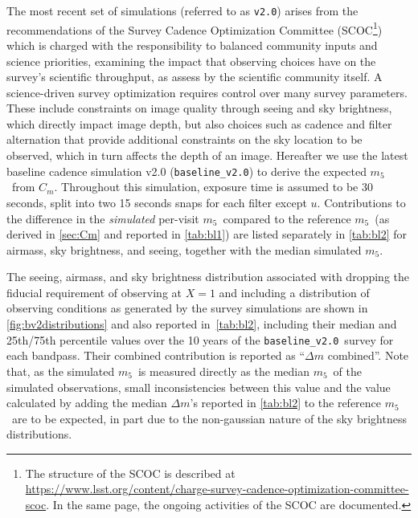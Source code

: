 \documentclass[PST,authoryear,toc]{lsstdoc}
\newcommand{\cm}{\ensuremath{C_m}}
\newcommand{\mf}{\ensuremath{m_5}}
\newcommand{\baseline}{\texttt{baseline\_v2.0}}
\begin{document}
 The most recent set of simulations (referred to as \texttt{v2.0}) arises from the recommendations of the Survey Cadence Optimization Committee (SCOC\footnote{The structure of the SCOC is described at \href{https://www.lsst.org/content/charge-survey-cadence-optimization-committee-scoc}{https://www.lsst.org/content/charge-survey-cadence-optimization-committee-scoc}. In the same page, the ongoing activities of the SCOC are documented.}) {which is charged with the responsibility to balanced community inputs and science priorities, examining the impact that observing choices have on the survey's scientific throughput, as assess by the scientific community itself. A science-driven survey optimization requires control over many survey parameters. These include constraints on image quality through seeing and sky brightness, which directly impact image depth, but also choices such as cadence and filter alternation that provide additional constraints on the sky location to be observed, which in turn affects the depth of an image}. Hereafter we use the latest baseline cadence simulation v2.0
(\baseline) to derive the expected \mf\ from \cm. Throughout this simulation, %
exposure time is assumed to be 30 seconds, split into two 15 seconds snaps for each filter except $u$. Contributions to the difference in the {\it simulated} per-visit \mf\ compared to the reference \mf\ (as derived in \autoref{sec:Cm} and reported in \autoref{tab:bl1}) are listed separately in \autoref{tab:bl2} for airmass, sky brightness, and seeing, together with the median simulated \mf.

 The seeing, airmass, and sky brightness distribution associated with dropping the fiducial requirement of observing at $X=1$ and including a distribution of observing conditions as generated by the survey simulations are shown in \autoref{fig:bv2distributions} and also reported in~\autoref{tab:bl2}, including their median and 25th/75th percentile values over the 10 years of the \baseline\ survey for each bandpass. Their combined contribution is reported as ``$\Delta m$ combined''. Note that, as the simulated \mf\ is measured directly as the median \mf\ of the simulated observations, small inconsistencies between this value and the value calculated by adding the median $\Delta m$'s reported in \autoref{tab:bl2} to the reference \mf\ are to be expected, in part due to the non-gaussian nature of the sky brightness distributions.
\end{document}
